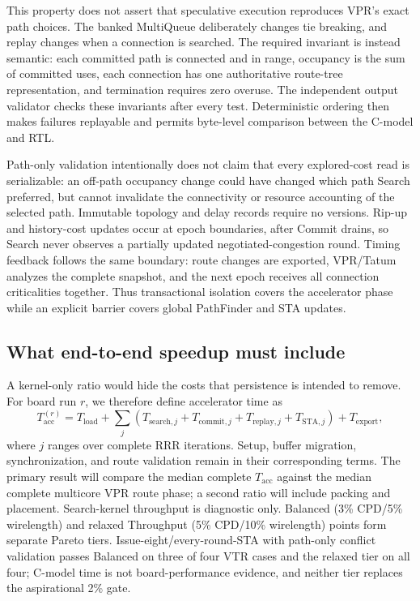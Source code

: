 \documentclass[sigconf,anonymous,review]{acmart}
\begin{document}
This property does not assert that speculative execution reproduces VPR's
exact path choices. The banked MultiQueue deliberately changes tie breaking,
and replay changes when a connection is searched. The required invariant is
instead semantic: each committed path is connected and in range, occupancy is
the sum of committed uses, each connection has one authoritative route-tree
representation, and termination requires zero overuse. The independent output
validator checks these invariants after every test. Deterministic ordering then
makes failures replayable and permits byte-level comparison between the
C-model and RTL.

Path-only validation intentionally does not claim that every explored-cost
read is serializable: an off-path occupancy change could have changed which
path Search preferred, but cannot invalidate the connectivity or resource
accounting of the selected path. Immutable topology and delay records require
no versions. Rip-up and history-cost updates occur at epoch
boundaries, after Commit drains, so Search never observes a partially updated
negotiated-congestion round. Timing feedback follows the same boundary: route
changes are exported, VPR/Tatum analyzes the complete snapshot, and the next
epoch receives all connection criticalities together. Thus transactional
isolation covers the accelerator phase while an explicit barrier covers global
PathFinder and STA updates.

\subsection{What end-to-end speedup must include}

A kernel-only ratio would hide the costs that persistence is intended to
remove. For board run $r$, we therefore define accelerator time as
\begin{equation}
 T_{\mathrm{acc}}^{(r)}=T_{\mathrm{load}}+\sum_j
 (T_{\mathrm{search},j}+T_{\mathrm{commit},j}+T_{\mathrm{replay},j}
 +T_{\mathrm{STA},j})+T_{\mathrm{export}},
\end{equation}
where $j$ ranges over complete RRR iterations. Setup, buffer migration,
synchronization, and route validation remain in their corresponding terms.
The primary result will compare the median complete $T_{\mathrm{acc}}$ against
the median complete multicore VPR route phase; a second ratio will include
packing and placement. Search-kernel throughput is diagnostic only.
Balanced (3\% CPD/5\% wirelength) and relaxed Throughput (5\% CPD/10\% wirelength) points form
separate Pareto tiers. Issue-eight/every-round-STA with path-only conflict
validation passes Balanced on three of four VTR cases and the relaxed tier on
all four; C-model time is not board-performance evidence, and neither tier
replaces the aspirational 2\% gate.
\end{document}
